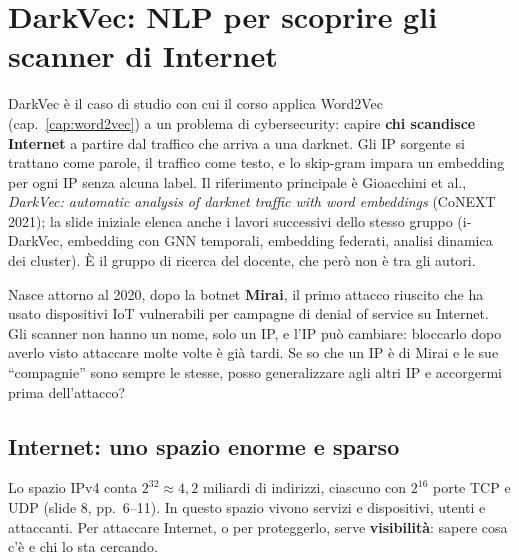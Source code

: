 \chapter{DarkVec: NLP per scoprire gli scanner di Internet}
\label{cap:darkvec}

DarkVec è il caso di studio con cui il corso applica Word2Vec (cap.~\ref{cap:word2vec}) a un problema di cybersecurity: capire
\textbf{chi scandisce Internet} a partire dal traffico che arriva a una darknet. Gli IP sorgente si trattano come parole, il traffico
come testo, e lo skip-gram impara un embedding per ogni IP senza alcuna label. Il riferimento principale è Gioacchini et al.,
\emph{DarkVec: automatic analysis of darknet traffic with word embeddings} (CoNEXT 2021); la slide iniziale elenca anche i lavori
successivi dello stesso gruppo (i-DarkVec, embedding con GNN temporali, embedding federati, analisi dinamica dei cluster). È il gruppo
di ricerca del docente, che però non è tra gli autori.

\begin{nota}
Nasce attorno al 2020, dopo la botnet \textbf{Mirai}, il primo attacco riuscito che ha usato dispositivi IoT vulnerabili per campagne di
denial of service su Internet. Gli scanner non hanno un nome, solo un IP, e l'IP può cambiare: bloccarlo dopo averlo visto attaccare
molte volte è già tardi. Se so che un IP è di Mirai e le sue ``compagnie'' sono sempre le stesse, posso generalizzare agli altri IP e
accorgermi prima dell'attacco?
\end{nota}

\section{Internet: uno spazio enorme e sparso}
Lo spazio IPv4 conta $2^{32} \approx 4{,}2$ miliardi di indirizzi, ciascuno con $2^{16}$ porte TCP e UDP (slide 8, pp.~6--11). In
questo spazio vivono servizi e dispositivi, utenti e attaccanti. Per attaccare Internet, o per proteggerlo, serve
\textbf{visibilità}: sapere cosa c'è e chi lo sta cercando.


